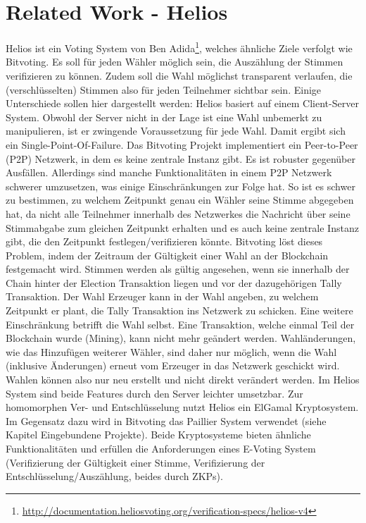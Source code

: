 \documentclass[colorback,accentcolor=tud1b]{tudreport}
\begin{document}
\section{Related Work - Helios}
Helios ist ein Voting System von Ben Adida\footnote{\url{http://documentation.heliosvoting.org/verification-specs/helios-v4}}, welches ähnliche Ziele verfolgt wie Bitvoting. Es soll für jeden Wähler möglich sein, die Auszählung der Stimmen verifizieren zu können. Zudem soll die Wahl möglichst transparent verlaufen, die (verschlüsselten) Stimmen also für jeden Teilnehmer sichtbar sein. Einige Unterschiede sollen hier dargestellt werden:
\newline
\newline
Helios basiert auf einem Client-Server System. Obwohl der Server nicht in der Lage ist eine Wahl unbemerkt zu manipulieren, ist er zwingende Voraussetzung für jede Wahl. Damit ergibt sich ein Single-Point-Of-Failure. Das Bitvoting Projekt implementiert ein Peer-to-Peer (P2P) Netzwerk, in dem es keine zentrale Instanz gibt. Es ist robuster gegenüber Ausfällen. Allerdings sind manche Funktionalitäten in einem P2P Netzwerk schwerer umzusetzen, was einige Einschränkungen zur Folge hat. So ist es schwer zu bestimmen, zu welchem Zeitpunkt genau ein Wähler seine Stimme abgegeben hat, da nicht alle Teilnehmer innerhalb des Netzwerkes die Nachricht über seine Stimmabgabe zum gleichen Zeitpunkt erhalten und es auch keine zentrale Instanz gibt, die den Zeitpunkt festlegen/verifizieren könnte. Bitvoting löst dieses Problem, indem der Zeitraum der Gültigkeit einer Wahl an der Blockchain festgemacht wird. Stimmen werden als gültig angesehen, wenn sie innerhalb der Chain hinter der Election Transaktion liegen und vor der dazugehörigen Tally Transaktion. Der Wahl Erzeuger kann in der Wahl angeben, zu welchem Zeitpunkt er plant, die Tally Transaktion ins Netzwerk zu schicken. Eine weitere Einschränkung betrifft die Wahl selbst. Eine Transaktion, welche einmal Teil der Blockchain wurde (Mining), kann nicht mehr geändert werden. Wahländerungen, wie das Hinzufügen weiterer Wähler, sind daher nur möglich, wenn die Wahl (inklusive Änderungen) erneut vom Erzeuger in das Netzwerk geschickt wird. Wahlen können also nur neu erstellt und nicht direkt verändert werden. Im Helios System sind beide Features durch den Server leichter umsetzbar.
\newline
Zur homomorphen Ver- und Entschlüsselung nutzt Helios ein ElGamal Kryptosystem. Im Gegensatz dazu wird in Bitvoting das Paillier System verwendet (siehe Kapitel Eingebundene Projekte). Beide Kryptosysteme bieten ähnliche Funktionalitäten und erfüllen die Anforderungen eines E-Voting System (Verifizierung der Gültigkeit einer Stimme, Verifizierung der Entschlüsselung/Auszählung, beides durch ZKPs).
\end{document}
